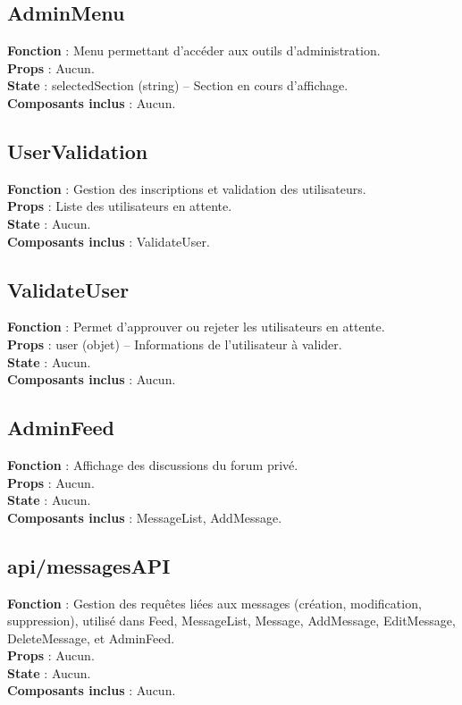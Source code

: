 \documentclass{article}
\begin{document}
\subsection*{AdminMenu}
\textbf{Fonction} : Menu permettant d’accéder aux outils d’administration.\\
\textbf{Props} : Aucun.\\
\textbf{State} : selectedSection (string) – Section en cours d’affichage.\\
\textbf{Composants inclus} : Aucun.

\subsection*{UserValidation}
\textbf{Fonction} : Gestion des inscriptions et validation des utilisateurs.\\
\textbf{Props} : Liste des utilisateurs en attente.\\
\textbf{State} : Aucun.\\
\textbf{Composants inclus} : ValidateUser.

\subsection*{ValidateUser}
\textbf{Fonction} : Permet d’approuver ou rejeter les utilisateurs en attente.\\
\textbf{Props} : user (objet) – Informations de l’utilisateur à valider.\\
\textbf{State} : Aucun.\\
\textbf{Composants inclus} : Aucun.

\subsection*{AdminFeed}
\textbf{Fonction} : Affichage des discussions du forum privé.\\
\textbf{Props} : Aucun.\\
\textbf{State} : Aucun.\\
\textbf{Composants inclus} : MessageList, AddMessage.

\subsection*{api/messagesAPI}
\textbf{Fonction} : Gestion des requêtes liées aux messages (création, modification, suppression), utilisé dans Feed, MessageList, Message, AddMessage, EditMessage, DeleteMessage, et AdminFeed.\\
\textbf{Props} : Aucun.\\
\textbf{State} : Aucun.\\
\textbf{Composants inclus} : Aucun.
\end{document}
